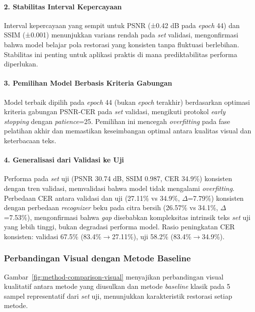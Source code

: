 \documentclass[12pt,a4paper]{article}
\begin{document}
\paragraph{2. Stabilitas Interval Kepercayaan}
Interval kepercayaan yang sempit untuk PSNR (±0.42 dB pada \textit{epoch} 44) dan SSIM (±0.001) menunjukkan varians rendah pada \textit{set} validasi, mengonfirmasi bahwa model belajar pola restorasi yang konsisten tanpa fluktuasi berlebihan. Stabilitas ini penting untuk aplikasi praktis di mana prediktabilitas performa diperlukan.

\paragraph{3. Pemilihan Model Berbasis Kriteria Gabungan}
Model terbaik dipilih pada \textit{epoch} 44 (bukan \textit{epoch} terakhir) berdasarkan optimasi kriteria gabungan PSNR-CER pada \textit{set} validasi, mengikuti protokol \textit{early stopping} dengan \textit{patience}=25. Pemilihan ini mencegah \textit{overfitting} pada fase pelatihan akhir dan memastikan keseimbangan optimal antara kualitas visual dan keterbacaan teks.

\paragraph{4. Generalisasi dari Validasi ke Uji}
Performa pada \textit{set} uji (PSNR 30.74 dB, SSIM 0.987, CER 34.9\%) konsisten dengan tren validasi, memvalidasi bahwa model tidak mengalami \textit{overfitting}. Perbedaan CER antara validasi dan uji (27.11\% vs 34.9\%, $\Delta$=7.79\%) konsisten dengan perbedaan \textit{recognizer} beku pada citra bersih (26.57\% vs 34.1\%, $\Delta$=7.53\%), mengonfirmasi bahwa \textit{gap} disebabkan kompleksitas intrinsik teks \textit{set} uji yang lebih tinggi, bukan degradasi performa model. Rasio peningkatan CER konsisten: validasi 67.5\% (83.4\%$\rightarrow$27.11\%), uji 58.2\% (83.4\%$\rightarrow$34.9\%).

\vspace{0.8em}

\subsubsection{Perbandingan Visual dengan Metode Baseline}
\label{subsubsec:perbandingan-visual-metode}

Gambar~\ref{fig:method-comparison-visual} menyajikan perbandingan visual kualitatif antara metode yang diusulkan dan metode \textit{baseline} klasik pada 5 sampel representatif dari \textit{set} uji, menunjukkan karakteristik restorasi setiap metode.
\end{document}
